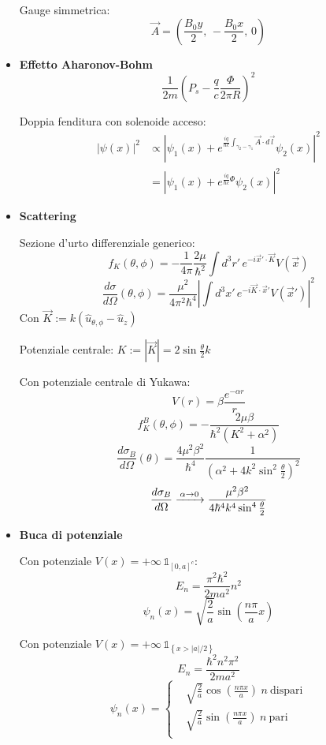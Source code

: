 \documentclass{article}
\newcommand{\myrightarrow}[1]{\xrightarrow{\makebox[2em][c]{$\scriptstyle#1$}}}
\begin{document}
\begin{footnotesize}
\begin{multicols*}{3}
\begin{itemize}[leftmargin=*]
		Gauge simmetrica:
		\[\vec{A} = \left(\frac{B_0y}{2},\, -\frac{B_0x}{2},\,0\right)\]

	\item \textbf{Effetto Aharonov-Bohm}
		\[\frac{1}{2m}\left(P_s - \frac{q}{c}\frac{\Phi }{2\pi R}\right)^2\]

		Doppia fenditura con solenoide acceso:
		\begin{align*}\left|\psi (x)\right|^2 &\propto \left|\psi _1(x) + e^{\frac{iq}{\hbar c} \int_{\gamma _2-\gamma _1}\vec{A}\cdot d\vec{l}} \psi _2(x)\right|^2  \\
		&=\left| \psi _1(x) + e^{\frac{iq}{\hbar c} \Phi } \psi _2(x)\right|^2 \end{align*}

	\item \textbf{Scattering}

		Sezione d'urto differenziale generico:
		\[f_K(\theta ,\phi ) = -\frac{1}{4\pi }\frac{2\mu }{\hbar ^2}  \int d^3r'\, e^{-i \vec{x}'\cdot \vec{K}} V(\vec{x})\]
		\[\frac{d\sigma }{d\Omega }(\theta ,\phi ) = \frac{\mu ^2}{4\pi ^2\hbar ^4} \left|\int d^3 x'\, e^{-i\vec{K}\cdot \vec{x}'} V(\vec{x}')\right|^2 \]
		Con $\vec{K} := k\left(\hat{u}_{\theta ,\phi } - \hat{u}_z\right)$

		Potenziale centrale: $K:=\left|\vec{K}\right| = 2\sin\frac{\theta }{2}k$

		Con potenziale centrale di Yukawa: $$V(r)=\beta \frac{e^{-\alpha r}}{r}$$
		\[f_K^B(\theta ,\phi ) = -\frac{2\mu \beta }{\hbar ^2\left(K^2+\alpha ^2\right)}\]
		\[\frac{d\sigma _B}{d\Omega }(\theta ) = \frac{4\mu ^2\beta ^2}{\hbar ^4} \frac{1}{\left(\alpha ^2 + 4k^2\sin^2\frac{\theta }{2}\right)^2}\]
		\[\frac{d\sigma _B}{d\Omega } \myrightarrow{\alpha  \rightarrow 0} \frac{\mu ^2\beta ^2}{4\hbar ^4k^4\sin^4{\frac{\theta }{2}}}\]


	\item \textbf{Buca di potenziale}

		Con potenziale $V(x) = +\infty \,\mathds{1}_{[0,a]^c}$:
		\[E_n = \frac{\pi ^2\hbar ^2}{2ma^2}n^2\]
		\[\psi _n(x) = \sqrt{\frac{2}{a}} \sin\left(\frac{n\pi }{a}x\right)\]

		Con potenziale $V(x) = +\infty \, \mathds{1}_{\left\{x > |a|/2\right\}}$
		\[E_n = \frac{\hbar ^2n^2\pi ^2}{2ma^2}\]
		\[\psi _n(x) = \left\{\begin{aligned}
		&\sqrt{\frac{2}{a}}\cos\left(\frac{n\pi x}{a}\right)\hspace{3pt}n\ \mathrm{dispari}\\
		&\sqrt{\frac{2}{a}}\sin\left(\frac{n\pi x}{a}\right)\hspace{3pt}n\ \mathrm{pari}\\
		\end{aligned}\right.\]




\end{itemize}
\end{multicols*}
\end{footnotesize}
\end{document}
